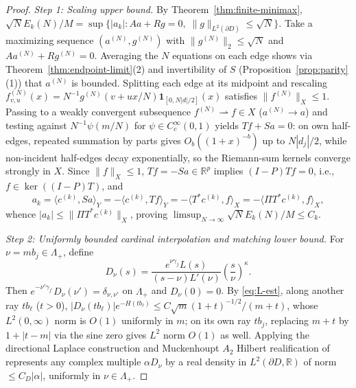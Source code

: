 \documentclass[11pt,reqno]{amsart}
\theoremstyle{definition}
\theoremstyle{remark}
\newcommand{\R}{\mathbb{R}}
\begin{document}
\begin{proof}
\emph{Step 1: Scaling upper bound.} By Theorem~\ref{thm:finite-minimax}, $\sqrt{N} E_k(N)/M = \sup\{|a_k| : A a + R g = 0,\; \|g\|_{L^2(\partial D)} \le \sqrt{N}\}$. Take a maximizing sequence $(a^{(N)}, g^{(N)})$ with $\|g^{(N)}\|_2 \le \sqrt{N}$ and $A a^{(N)} + R g^{(N)} = 0$. Averaging the $N$ equations on each edge shows via Theorem~\ref{thm:endpoint-limit}(2) and invertibility of $S$ (Proposition~\ref{prop:parity}(1)) that $a^{(N)}$ is bounded. Splitting each edge at its midpoint and rescaling $f_{v,u}^{(N)}(x) = N^{-1} g^{(N)}(v + u x / N) \mathbf{1}_{[0, N|d|/2]}(x)$ satisfies $\|f^{(N)}\|_X \le 1$. Passing to a weakly convergent subsequence $f^{(N)} \rightharpoonup f \in X$ ($a^{(N)} \to a$) and testing against $N^{-1}\psi(m/N)$ for $\psi \in C_c^\infty(0,1)$ yields $T f + S a = 0$: on own half-edges, repeated summation by parts gives $O_b((1+x)^{-b})$ up to $N|d_j|/2$, while non-incident half-edges decay exponentially, so the Riemann-sum kernels converge strongly in $X$. Since $\|f\|_X \le 1$, $T f = -S a \in \R^p$ implies $(I - P) T f = 0$, i.e., $f \in \ker((I-P)T)$, and
\[
  a_k = \langle c^{(k)}, S a \rangle_Y = -\langle c^{(k)}, T f \rangle_Y = -\langle T^* c^{(k)}, f \rangle_X = -\langle \Pi T^* c^{(k)}, f \rangle_X,
\]
whence $|a_k| \le \|\Pi T^* c^{(k)}\|_X$, proving $\limsup_{N\to\infty} \sqrt{N} E_k(N)/M \le C_k$.

\emph{Step 2: Uniformly bounded cardinal interpolation and matching lower bound.} For $\nu = m b_j \in \Lambda_+$, define
\begin{equation}\label{eq:D-nu}
  D_\nu(s) = \frac{e^{\nu\gamma_j} L(s)}{(s - \nu) L'(\nu)} \left(\frac{s}{\nu}\right)^\kappa.
\end{equation}
Then $e^{-\nu'\gamma_{j'}} D_\nu(\nu') = \delta_{\nu,\nu'}$ on $\Lambda_+$ and $D_\nu(0) = 0$. By \eqref{eq:L-est}, along another ray $t b_\ell$ ($t > 0$), $|D_\nu(t b_\ell)| e^{-H(t b_\ell)} \le C \sqrt{m}(1+t)^{-1/2}/(m+t)$, whose $L^2(0,\infty)$ norm is $O(1)$ uniformly in $m$; on its own ray $t b_j$, replacing $m+t$ by $1 + |t - m|$ via the sine zero gives $L^2$ norm $O(1)$ as well. Applying the directional Laplace construction and Muckenhoupt $A_2$ Hilbert realification of \cite[Theorem~4.1]{Paper1} represents any complex multiple $\alpha D_\nu$ by a real density in $L^2(\partial D, \R)$ of norm $\le C_D |\alpha|$, uniformly in $\nu \in \Lambda_+$.


\end{proof}
\end{document}
